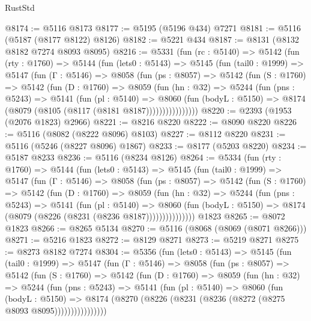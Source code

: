 \begin{lexlean}{RustStd}
\begin{coremodule}
{\begin{coremodule}
{{{{{{{{{{{{{{{{{{{{{{{{{{{{{{{@8174 := @5116 @8173
@8177 := @5195 (@5196 @434) @7271
@8181 := @5116 (@5187 (@8177 @8122) @8126)
@8182 := @5221 @434
@8187 := @8131 (@8132 @8182 @7274 @8093 @8095)
@8216 := @5331
    (fun (rc : @5140) =>
    @5142
      (fun (rty : @1760) =>
      @5144
        (fun (lets0 : @5143) =>
        @5145
          (fun (tail0 : @1999) =>
          @5147
            (fun (Γ : @5146) =>
            @8058
              (fun (ps : @8057) =>
              @5142
                (fun (S : @1760) =>
                @5142
                  (fun (D : @1760) =>
                  @8059
                    (fun (hn : @32) =>
                    @5244
                      (fun (pns : @5243) =>
                      @5141
                        (fun (pl : @5140) =>
                        @8060
                          (fun (bodyL : @5150) =>
                          @8174 (@8079 (@8105 (@8117 (@8181 @8187))))))))))))))))
@8220 := @2393 (@1953 (@2076 @1823) @2966)
@8221 := @8216 @8220
@8222 := @8090 @8220
@8226 := @5116 (@8082 (@8222 @8096) @8103)
@8227 := @8112 @8220
@8231 := @5116 (@5246 (@8227 @8096) @1867)
@8233 := @8177 (@5203 @8220)
@8234 := @5187 @8233
@8236 := @5116 (@8234 @8126)
@8264 := @5334
    (fun (rty : @1760) =>
    @5144
      (fun (lets0 : @5143) =>
      @5145
        (fun (tail0 : @1999) =>
        @5147
          (fun (Γ : @5146) =>
          @8058
            (fun (ps : @8057) =>
            @5142
              (fun (S : @1760) =>
              @5142
                (fun (D : @1760) =>
                @8059
                  (fun (hn : @32) =>
                  @5244
                    (fun (pns : @5243) =>
                    @5141
                      (fun (pl : @5140) =>
                      @8060
                        (fun (bodyL : @5150) =>
                        @8174 (@8079 (@8226 (@8231 (@8236 @8187)))))))))))))))
    @1823
@8265 := @8072 @1823
@8266 := @8265 @5134
@8270 := @5116 (@8068 (@8069 (@8071 @8266)))
@8271 := @5216 @1823
@8272 := @8129 @8271
@8273 := @5219 @8271
@8275 := @8273 @8182 @7274
@8304 := @5356
    (fun (lets0 : @5143) =>
    @5145
      (fun (tail0 : @1999) =>
      @5147
        (fun (Γ : @5146) =>
        @8058
          (fun (ps : @8057) =>
          @5142
            (fun (S : @1760) =>
            @5142
              (fun (D : @1760) =>
              @8059
                (fun (hn : @32) =>
                @5244
                  (fun (pns : @5243) =>
                  @5141
                    (fun (pl : @5140) =>
                    @8060
                      (fun (bodyL : @5150) =>
                      @8174 (@8270 (@8226 (@8231 (@8236 (@8272 (@8275 @8093 @8095))))))))))))))))
}}}}}}}}}}}}}}}}}}}}}}}}}}}}}}}
\end{coremodule}}
\end{coremodule}
\end{lexlean}
